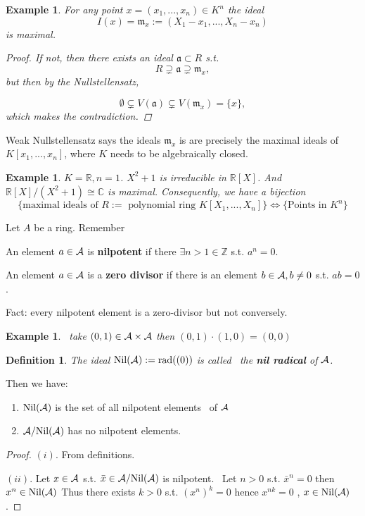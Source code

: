 \documentclass[11pt]{article}
\newtheorem{dfn}[thm]{Definition}
\newtheorem{ex}[thm]{Example}
\newcommand{\reals}{\mathbb R}
\newcommand{\cplx}{\mathbb C}
\newcommand{\intg}{\mathbb Z}
\newcommand{\sca}{{\mathfrak a}}
\newcommand{\scm}{{\mathfrak m}}
\newcommand{\cala}{{\cal A}}
\begin{document}
\begin{ex}
For any point $x=(x_1,...,x_n) \in K^n$ the ideal 
$$
I({x})=\scm_x:=(X_1-x_1,...,X_n-x_n)
$$
is maximal.
\begin{proof}

 If not, then there exists an ideal $\sca \subset R$
s.t. 
\begin{equation*}
R\supsetneq \sca \supsetneq \scm_x,
\end{equation*}
but then by the Nullstellensatz,

\begin{equation*}
\emptyset\subsetneq V(\sca) \subsetneq V(\scm_x)=\{x\},
\end{equation*}
which makes the contradiction.
\end{proof}
\end{ex}

Weak Nullstellensatz says the ideals $\scm_x$ is are precisely the maximal ideals of $K[x_1,...,x_n]$, where $K$ needs to be algebraically closed.
\begin{ex}
$K=\reals, n=1$.
$X^2+1$ is irreducible in $\reals[X]$.
And $\reals[X]/(X^2+1) \cong \cplx$ is maximal.
Consequently, we have a bijection
$$
\{\text{maximal ideals of $R:=$ polynomial ring }K[X_1,...,X_n]\}
\Longleftrightarrow\{\text{Points in } K^n\}
$$
\end{ex}

Let $A$ be a ring.
Remember 

    An element $a\in \cala$ is \textbf{nilpotent} if there $\exists n>1\in \intg$ s.t. $a^n=0$.

    An element $a\in \cala$ is a \textbf{zero divisor} if there is an element $b\in \cala, b\neq 0$ s.t. $ab=0$.

Fact: every nilpotent element is a zero-divisor  but not conversely.

\begin{ex}
     take $(0,1)\in \cala\times \cala$ then $(0,1)\cdot(1,0) =(0,0)$
\end{ex}

\begin{dfn}
 The ideal $\text{Nil}(\cala):=\text{rad}((0))$ is called  the \textbf{nil radical} of $\cala$.
\end{dfn}

Then we have:
\begin{enumerate}[label=(\roman*)]
\item $\text{Nil}(\cala)$ is the set of all nilpotent elements  of $\cala$
\item $\cala/\text{Nil}(\cala)$ has no nilpotent elements.
\end{enumerate}
\begin{proof}
$(i)$. From definitions.

$(ii)$. Let $x\in \cala$ s.t. $\bar{x}\in \cala/\text{Nil}(\cala)$ is nilpotent.
 Let $n>0$ s.t. $\bar{x}^n=0$ then $x^n \in \text{Nil}(\cala)$
Thus there exists $k>0$ s.t. $(x^n)^k=0$ hence $x^{nk}=0$
, $x\in \text{Nil}(\cala)$.
\end{proof}
\end{document}
